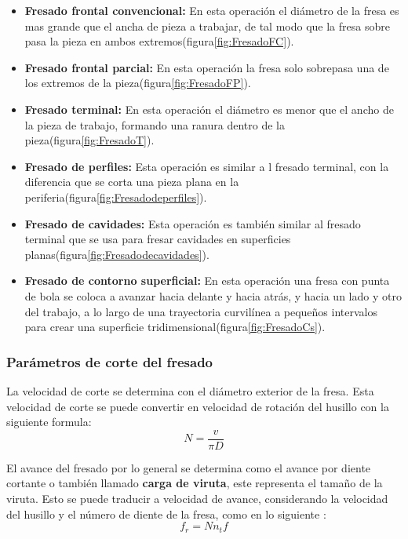 \begin{itemize}
    \item \textbf{Fresado frontal convencional:} En esta operación el diámetro de la fresa es mas grande que el ancha de pieza a trabajar, de tal modo que la fresa sobre pasa la pieza en ambos extremos(figura\ref{fig:FresadoFC}).
    \item\textbf{Fresado frontal parcial:} En esta operación la fresa solo sobrepasa una de los extremos de la pieza(figura\ref{fig:FresadoFP}).
    \item\textbf{Fresado terminal:} En esta operación el diámetro es menor que el ancho de la pieza de trabajo, formando una ranura dentro de la pieza(figura\ref{fig:FresadoT}).
    \item\textbf{Fresado de perfiles:} Esta operación es similar a l fresado terminal, con la diferencia que se corta una pieza plana en la periferia(figura\ref{fig:Fresadodeperfiles}).
    \item\textbf{Fresado de cavidades:} Esta operación es también similar al fresado terminal que se usa para fresar cavidades en superficies planas(figura\ref{fig:Fresadodecavidades}).
    \item\textbf{Fresado de contorno superficial:} En esta operación una fresa con punta de bola se coloca a avanzar hacia delante y hacia atrás, y hacia un lado y otro del trabajo, a lo largo de una trayectoria curvilínea a pequeños intervalos para crear una superficie tridimensional(figura\ref{fig:FresadoCs}). 
    
\end{itemize} 

\subsubsection*{Parámetros de corte del fresado}
La velocidad de corte se determina con el diámetro exterior de la fresa. Esta velocidad de corte se puede convertir en velocidad de rotación del husillo con la siguiente formula:
\begin{equation}
    N=\frac{v}{\pi D}
\end{equation}

El avance del fresado por lo general se determina como el avance por diente cortante o también llamado \textbf{carga de viruta}, este representa el tamaño de la viruta. Esto se puede traducir a velocidad de avance, considerando la velocidad del husillo y el número de diente de la fresa, como en lo siguiente \citep{groover2007fundamentals}:
\begin{equation}
    f_{r}=N n_{t} f
\end{equation}

